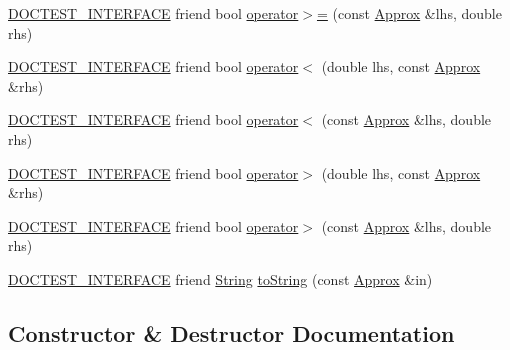 \begin{DoxyCompactItemize}
\item 
\mbox{\hyperlink{doctest_8h_a9c16ffc635ec47f07797d21ede26b1a5}{D\+O\+C\+T\+E\+S\+T\+\_\+\+I\+N\+T\+E\+R\+F\+A\+CE}} friend bool \mbox{\hyperlink{classdoctest_1_1_approx_a52e1bcec19171f0ec55cc3a280188a03}{operator$>$=}} (const \mbox{\hyperlink{classdoctest_1_1_approx}{Approx}} \&lhs, double rhs)
\item 
\mbox{\hyperlink{doctest_8h_a9c16ffc635ec47f07797d21ede26b1a5}{D\+O\+C\+T\+E\+S\+T\+\_\+\+I\+N\+T\+E\+R\+F\+A\+CE}} friend bool \mbox{\hyperlink{classdoctest_1_1_approx_acf32148e34dc6444a3bb4b16e7298279}{operator$<$}} (double lhs, const \mbox{\hyperlink{classdoctest_1_1_approx}{Approx}} \&rhs)
\item 
\mbox{\hyperlink{doctest_8h_a9c16ffc635ec47f07797d21ede26b1a5}{D\+O\+C\+T\+E\+S\+T\+\_\+\+I\+N\+T\+E\+R\+F\+A\+CE}} friend bool \mbox{\hyperlink{classdoctest_1_1_approx_a54ce2536ed164b79688f43e373dcbf7b}{operator$<$}} (const \mbox{\hyperlink{classdoctest_1_1_approx}{Approx}} \&lhs, double rhs)
\item 
\mbox{\hyperlink{doctest_8h_a9c16ffc635ec47f07797d21ede26b1a5}{D\+O\+C\+T\+E\+S\+T\+\_\+\+I\+N\+T\+E\+R\+F\+A\+CE}} friend bool \mbox{\hyperlink{classdoctest_1_1_approx_a97a6e92b9c9dacc0adb2f76f9faf2924}{operator$>$}} (double lhs, const \mbox{\hyperlink{classdoctest_1_1_approx}{Approx}} \&rhs)
\item 
\mbox{\hyperlink{doctest_8h_a9c16ffc635ec47f07797d21ede26b1a5}{D\+O\+C\+T\+E\+S\+T\+\_\+\+I\+N\+T\+E\+R\+F\+A\+CE}} friend bool \mbox{\hyperlink{classdoctest_1_1_approx_a12a93e1726180db4091cb2e3b8ba5e30}{operator$>$}} (const \mbox{\hyperlink{classdoctest_1_1_approx}{Approx}} \&lhs, double rhs)
\item 
\mbox{\hyperlink{doctest_8h_a9c16ffc635ec47f07797d21ede26b1a5}{D\+O\+C\+T\+E\+S\+T\+\_\+\+I\+N\+T\+E\+R\+F\+A\+CE}} friend \mbox{\hyperlink{classdoctest_1_1_string}{String}} \mbox{\hyperlink{classdoctest_1_1_approx_aa1ba324952b7844d35fc569b1c6c139a}{to\+String}} (const \mbox{\hyperlink{classdoctest_1_1_approx}{Approx}} \&in)
\end{DoxyCompactItemize}


\subsection{Constructor \& Destructor Documentation}
\mbox{\label{classdoctest_1_1_approx_a86f0d1b44c1cf095697f23ccdab00802}} 
